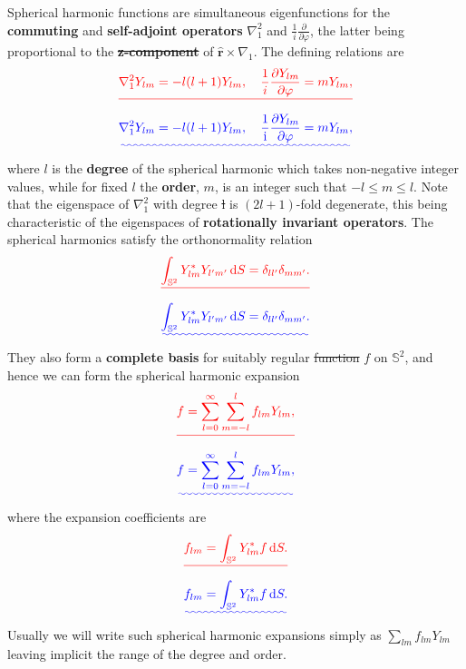 \documentclass[a4paper,12pt]{paper}
\providecommand{\DIFadd}[1]{{\protect\color{blue}\uwave{#1}}} %
\providecommand{\DIFdel}[1]{{\protect\color{red}\sout{#1}}}                      %
\providecommand{\DIFaddbegin}{} %
\providecommand{\DIFaddend}{} %
\providecommand{\DIFdelbegin}{} %
\providecommand{\DIFdelend}{} %
\begin{document}
Spherical harmonic functions are simultaneous eigenfunctions for the 
 \textbf{commuting} and \textbf{self-adjoint operators} $\nabla_{1}^{2}$ and \DIFdelbegin \DIFdel{$\frac{1}{i}\frac{\partial}{\partial\varphi}$}\DIFdelend \DIFaddbegin \DIFadd{$\frac{1}{\ii}\frac{\partial}{\partial\varphi}$}\DIFaddend , the latter being proportional to the \textbf{\DIFdelbegin \DIFdel{z-component}\DIFdelend \DIFaddbegin \DIFadd{$z$-component}\DIFaddend }
  of $\hat{\mathbf{r}}\times\nabla_{1}$. The defining relations are
\DIFdelbegin \begin{displaymath}
\DIFdel{\nabla_{1}^{2}Y_{lm}=-l(l+1)Y_{lm}, \quad \frac{1}{i}\frac{\partial Y_{lm}}{\partial\varphi}=mY_{lm},
}\end{displaymath}%
\DIFdelend \DIFaddbegin \begin{equation}\DIFadd{\label{eq:3}
\nabla_{1}^{2}Y_{lm}=-l(l+1)Y_{lm}, \quad \frac{1}{\ii}\frac{\partial Y_{lm}}{\partial\varphi}=mY_{lm},
}\end{equation}\DIFaddend 
where $l$ is the \textbf{degree} of the spherical harmonic which takes non-negative integer values, while for fixed $l$ the \textbf{order}, $m$, 
is an integer such that $-l\le m\le l$. Note that the eigenspace of $\nabla_{1}^{2}$ with degree \DIFdelbegin \DIFdel{l }\DIFdelend \DIFaddbegin \DIFadd{$l$ }\DIFaddend is $(2l+1)$-fold degenerate, 
this being characteristic of the eigenspaces of \textbf{rotationally invariant operators}. The spherical harmonics satisfy the orthonormality relation
\DIFdelbegin \begin{displaymath}
\DIFdel{\int_{\mathbb{S}^{2}}Y_{lm}^{*}Y_{l'm'}\dd S=\delta_{ll'}\delta_{mm'}.
}\end{displaymath}%
\DIFdelend \DIFaddbegin \begin{equation}\DIFadd{\label{eq:4}
\int_{\mathbb{S}^{2}}Y_{lm}^{*}Y_{l'm'}\dd S=\delta_{ll'}\delta_{mm'}.
}\end{equation}\DIFaddend 
They also form a \textbf{complete basis} for suitably regular \DIFdelbegin \DIFdel{function }\DIFdelend \DIFaddbegin \DIFadd{functions }\DIFaddend $f$ on $\mathbb{S}^{2}$, and hence we
 can form the spherical harmonic expansion
\DIFdelbegin \begin{displaymath}
\DIFdel{f=\sum_{l=0}^{\infty}\sum_{m=-l}^{l}f_{lm}Y_{lm},
}\end{displaymath}%
\DIFdelend \DIFaddbegin \begin{equation}\DIFadd{\label{eq:5}
f=\sum_{l=0}^{\infty}\sum_{m=-l}^{l}f_{lm}Y_{lm},
}\end{equation}\DIFaddend 
where the expansion coefficients are
\DIFdelbegin \begin{displaymath}
\DIFdel{f_{lm}=\int_{\mathbb{S}^{2}}Y_{lm}^{*}f\dd S.
}\end{displaymath}%
\DIFdelend \DIFaddbegin \begin{equation}\DIFadd{\label{eq:6}
f_{lm}=\int_{\mathbb{S}^{2}}Y_{lm}^{*}f\dd S.
}\end{equation}\DIFaddend 
Usually we will write such spherical harmonic expansions simply as $\sum_{lm}f_{lm}Y_{lm}$ leaving implicit the range of the degree and order. 
\end{document}
